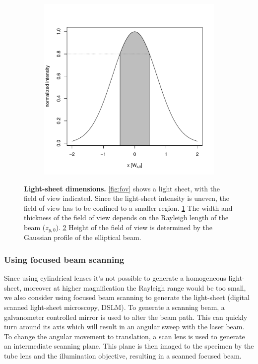 \documentclass{diploma_style}
\begin{document}
\begin{figure}[b!]
\begin{subfigure}[b]{0.49\textwidth}
		\caption{}
		\label{fig:width}
	\end{subfigure}
	\begin{subfigure}[b]{0.49\textwidth}
		\centering
		\includegraphics[width=\textwidth]{figures/2_spim/height}
		\caption{}
		\label{fig:height}
	\end{subfigure}
	\caption{\textbf{Light-sheet dimensions.} \ref{fig:fov} shows a light sheet, with the field of view indicated. Since the light-sheet intensity is uneven, the field of view has to be confined to a smaller region. \ref{fig:width} The width and thickness of the field of view depends on the Rayleigh length of the beam ($z_{y,0}$). \ref{fig:height} Height of the field of view is determined by the Gaussian profile of the elliptical beam.}
	\label{fig:ls_dim}
\end{figure}

\subsubsection{Using focused beam scanning}
Since using cylindrical lenses it's not possible to generate a homogeneous light-sheet, moreover at higher magnification the Rayleigh range would be too small, we also consider using focused beam scanning to generate the light-sheet (digital scanned light-sheet microscopy, DSLM). To generate a scanning beam, a galvanometer controlled mirror is used to alter the beam path. This can quickly turn around its axis which will result in an angular sweep with the laser beam. To change the angular movement to translation, a scan lens is used to generate an intermediate scanning plane. This plane is then imaged to the specimen by the tube lens and the illumination objective, resulting in a scanned focused beam.
\end{document}

